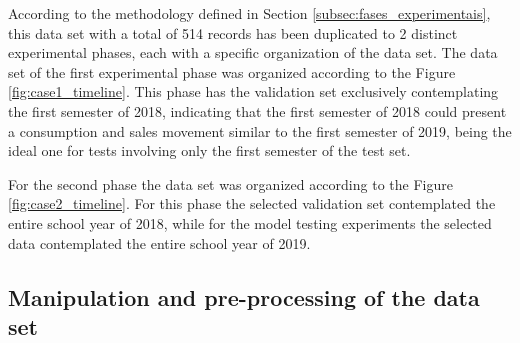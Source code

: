     According to the methodology defined in Section \ref{subsec:fases_experimentais}, this data set with a total of 514 records has been duplicated to 2 distinct experimental phases, each with a specific organization of the data set. The data set of the first experimental phase was organized according to the Figure \ref{fig:case1_timeline}. This phase has the validation set exclusively contemplating the first semester of 2018, indicating that the first semester of 2018 could present a consumption and sales movement similar to the first semester of 2019, being the ideal one for tests involving only the first semester of the test set.

    \begin{figure}[htb]
        \end{figure}
    For the second phase the data set was organized according to the Figure \ref{fig:case2_timeline}. For this phase the selected validation set contemplated the entire school year of 2018, while for the model testing experiments the selected data contemplated the entire school year of 2019.
    
    \begin{figure}[H]
        \end{figure}
   
    \subsection{Manipulation and pre-processing of the data set}
    
